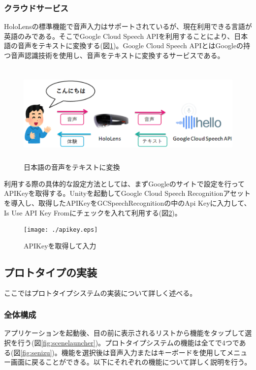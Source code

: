 \documentclass[11pt,a4j, titlepage]{jarticle} %
\begin{document}
\subsubsection{クラウドサービス}
HoloLensの標準機能で音声入力はサポートされているが、現在利用できる言語が英語のみである\cite{emuniwa}。そこでGoogle Cloud Speech API\cite{google_speech}を利用することにより、日本語の音声をテキストに変換する(図\ref{fig:googlespeech})。Google Cloud Speech APIとはGoogleの持つ音声認識技術を使用し、音声をテキストに変換するサービスである。

\begin{figure}[H]
  \begin{center}
    \includegraphics[clip,height=5.0cm,width=14.0cm]{./googlespeech.eps}
    \caption{日本語の音声をテキストに変換}
    \label{fig:googlespeech}
  \end{center}
\end{figure}

利用する際の具体的な設定方法としては、まずGoogleのサイトで設定を行ってAPIKeyを取得する\cite{googlesetting}。Unityを起動してGoogle Cloud Speech Recognitionアセット\cite{speechrecognition}を導入し、取得したAPIKeyをGCSpeechRecognitionの中のApi Keyに入力して、Is Use API Key Fromにチェックを入れて利用する(図\ref{fig:apikey})。

\begin{figure}[H]
  \begin{center}
    \texttt{[image: ./apikey.eps]}
    \caption{APIKeyを取得して入力}
    \label{fig:apikey}
  \end{center}
\end{figure}

\subsection{プロトタイプの実装}
ここではプロトタイプシステムの実装について詳しく述べる。

\subsubsection{全体構成}
アプリケーションを起動後、目の前に表示されるリストから機能をタップして選択を行う(図\ref{fig:scenelauncher})。プロトタイプシステムの機能は全てで4つである(図\ref{fig:senizu})。機能を選択後は音声入力またはキーボードを使用してメニュー画面に戻ることができる。以下にそれぞれの機能について詳しく説明を行う。
\end{document}
